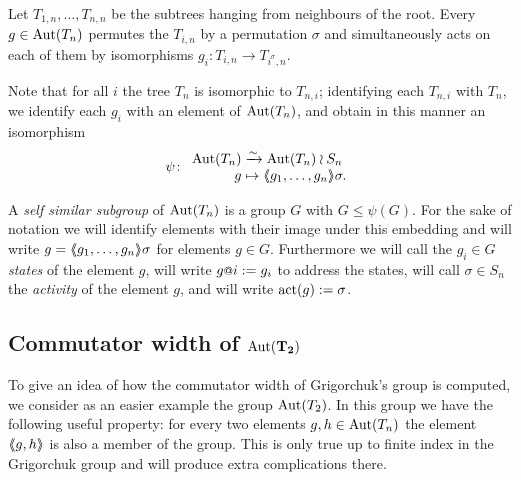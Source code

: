 \documentclass[a4paper,11pt]{amsart}
\begin{document}
Let $T_{1,n},\dotsc,T_{n,n}$ be the subtrees hanging from neighbours of the root. 
Every $g\in\operatorname{{Aut}}(T_n)$ permutes the $T_{i,n}$ by a permutation $\sigma$ and simultaneously
acts on each of them by isomorphisms $g_i\colon T_{i,n}\to T_{i^\sigma,n}$.

Note that for all $i$ the tree $T_n$ is isomorphic to $T_{n,i}$; identifying each $T_{n,i}$ with $T_n$, we identify each $g_i$ with an element of $\operatorname{{Aut}}(T_n)$, and obtain in this manner an isomorphism
\[\psi\colon\begin{array}{r@{\;}l}
              \Aut(T_n) &\xrightarrow{\sim} \Aut(T_n)\wr S_n\\
              g &\mapsto \pair{g_1,\dotsc,g_n}\sigma.
            \end{array}
\]

A \emph{self similar subgroup} of $\operatorname{{Aut}}(T_n)$ is a group $G$ with $G\leq \psi(G)$. 
For the sake of notation we will identify elements with their image under this embedding
and will write $g=\langle\negthickspace\langle g_1,\dotsc,g_n\rangle\negthickspace\rangle\sigma$ for elements $g\in G$. 
Furthermore we will call the $g_i\in G$ \emph{states} of the element $g$,
will write $g\at{i}:=g_i$ to address the states, will
call $\sigma \in S_n$ the \emph{activity} of the element $g$, 
and will write $\operatorname{act}(g):= \sigma$. 


\subsection{Commutator width of \texorpdfstring{$\mathbf{\textup{Aut}(T_2)}$}{Aut(T2)} }
To give an idea of how the commutator width of Grigorchuk's group is computed,
we consider as an easier example the group $\operatorname{{Aut}}(T_2)$. In this group
we have the following useful property: for every two elements $g,h\in \operatorname{{Aut}}(T_n)$ the
element $\langle\negthickspace\langle g,h\rangle\negthickspace\rangle$ is also a member of the group.
This is only true up to finite index in the Grigorchuk group
and will produce extra complications there.
\end{document}
